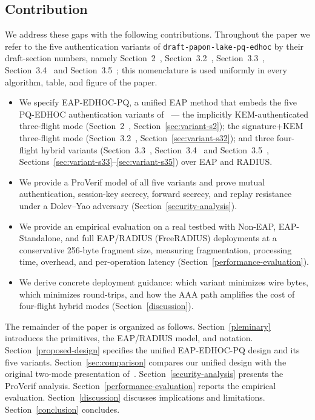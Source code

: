 \documentclass{easychair}
\newcommand{\VarSec}[1]{Section~#1~\cite{pq-edhoc-draft}}
\begin{document}
\subsection{Contribution}
\label{sec:contribution}
We address these gaps with the following contributions. Throughout the
paper we refer to the five authentication variants of
\texttt{draft-papon-lake-pq-edhoc} by their draft-section numbers,
namely \VarSec{2}, \VarSec{3.2}, \VarSec{3.3}, \VarSec{3.4} and
\VarSec{3.5}; this nomenclature is used uniformly in every algorithm,
table, and figure of the paper.
\begin{itemize}[leftmargin=1.2em,itemsep=2pt,topsep=2pt]
\item We specify EAP-EDHOC-PQ, a unified EAP method that embeds
the five PQ-EDHOC authentication variants of~\cite{pq-edhoc-draft} ---
the implicitly KEM-authenticated three-flight mode (\VarSec{2},
Section~\ref{sec:variant-s2}); the signature+KEM three-flight mode
(\VarSec{3.2}, Section~\ref{sec:variant-s32}); and three four-flight
hybrid variants (\VarSec{3.3}, \VarSec{3.4} and \VarSec{3.5},
Sections~\ref{sec:variant-s33}--\ref{sec:variant-s35}) over EAP and
RADIUS.
\item We provide a ProVerif model of all five variants and prove
mutual authentication, session-key secrecy, forward secrecy, and replay
resistance under a Dolev--Yao adversary
(Section~\ref{security-analysis}).
\item We provide an empirical evaluation on a real testbed with
Non-EAP, EAP-Standalone, and full EAP/RADIUS (FreeRADIUS) deployments at
a conservative 256-byte fragment size, measuring fragmentation,
processing time, overhead, and per-operation latency
(Section~\ref{performance-evaluation}).
\item We derive concrete deployment guidance: which variant
minimizes wire bytes, which minimizes round-trips, and how the AAA path
amplifies the cost of four-flight hybrid modes
(Section~\ref{discussion}).
\end{itemize}

The remainder of the paper is organized as follows.
Section~\ref{pleminary} introduces the primitives, the EAP/RADIUS model,
and notation. Section~\ref{proposed-design} specifies the unified
EAP-EDHOC-PQ design and its five variants.
Section~\ref{sec:comparison} compares our unified design with the
original two-mode presentation of~\cite{pq-edhoc-draft}.
Section~\ref{security-analysis} presents the ProVerif analysis.
Section~\ref{performance-evaluation} reports the empirical evaluation.
Section~\ref{discussion} discusses implications and limitations.
Section~\ref{conclusion} concludes.
\end{document}
